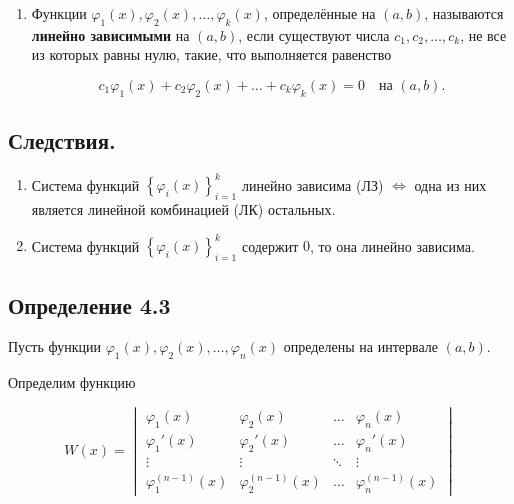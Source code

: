 {\begin{enumerate}
	\[
	c_1 \varphi_1(x) + c_2 \varphi_2(x) + \ldots + c_k \varphi_k(x) = 0 \quad \text{на } (a, b)
	\]


	возможно только в случае, когда \( c_1 = c_2 = \ldots = c_k = 0 \).

	\item Функции \( \varphi_1(x), \varphi_2(x), \ldots, \varphi_k(x) \), определённые на \( (a, b) \), называются \textbf{линейно зависимыми} на \( (a, b) \), если существуют числа \( c_1, c_2, \ldots, c_k \), не все из которых равны нулю, такие, что выполняется равенство
	

	\[
	c_1 \varphi_1(x) + c_2 \varphi_2(x) + \ldots + c_k \varphi_k(x) = 0 \quad \text{на } (a, b).
	\]


	\end{enumerate}

	\subsection*{Следствия.}


	\begin{enumerate}
		\item Система функций \( \left\{ \varphi_i(x) \right\}_{i=1}^{k} \) линейно зависима (ЛЗ) \(\iff\) одна из них является линейной комбинацией (ЛК) остальных.
		
		\item Система функций \( \left\{ \varphi_i(x) \right\}_{i=1}^{k} \) содержит \textbf{\(0\)}, то она линейно зависима.
	\end{enumerate}


	\subsection*{Определение 4.3}

	Пусть функции \( \varphi_1(x), \varphi_2(x), \ldots, \varphi_n(x) \) определены на интервале \( (a, b) \).

	Определим функцию


	\[
	W(x) = 
	\begin{vmatrix}
	\varphi_1(x) & \varphi_2(x) & \ldots & \varphi_n(x) \\
	\varphi_1'(x) & \varphi_2'(x) & \ldots & \varphi_n'(x) \\
	\vdots & \vdots & \ddots & \vdots \\
	\varphi_1^{(n-1)}(x) & \varphi_2^{(n-1)}(x) & \ldots & \varphi_n^{(n-1)}(x)
	\end{vmatrix}
	\]



}
